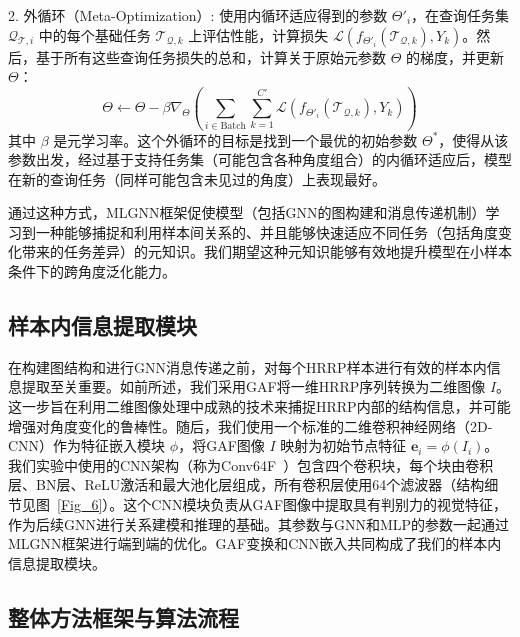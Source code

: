 2.  外循环（Meta-Optimization）: 使用内循环适应得到的参数 $\Theta'_i$，在查询任务集 $\mathcal{Q}_{\mathcal{T},i}$ 中的每个基础任务 $\mathcal{T}_{\mathcal{Q},k}$ 上评估性能，计算损失 $\mathcal{L}(f_{\Theta'_i}(\mathcal{T}_{\mathcal{Q},k}), Y_k)$。然后，基于所有这些查询任务损失的总和，计算关于原始元参数 $\Theta$ 的梯度，并更新 $\Theta$：
    \begin{equation}
        \Theta \leftarrow \Theta - \beta \nabla_{\Theta} \left( \sum_{i \in \text{Batch}} \sum_{k=1}^{C'} \mathcal{L}(f_{\Theta'_i}(\mathcal{T}_{\mathcal{Q},k}), Y_k) \right)
        \label{eq:mlgnn_outer_update}
    \end{equation}
    其中 $\beta$ 是元学习率。这个外循环的目标是找到一个最优的初始参数 $\Theta^*$，使得从该参数出发，经过基于支持任务集（可能包含各种角度组合）的内循环适应后，模型在新的查询任务（同样可能包含未见过的角度）上表现最好。

通过这种方式，MLGNN框架促使模型（包括GNN的图构建和消息传递机制）学习到一种能够捕捉和利用样本间关系的、并且能够快速适应不同任务（包括角度变化带来的任务差异）的元知识。我们期望这种元知识能够有效地提升模型在小样本条件下的跨角度泛化能力。

\subsection{样本内信息提取模块}
\label{subsec:intra_sample_module}

在构建图结构和进行GNN消息传递之前，对每个HRRP样本进行有效的样本内信息提取至关重要。如前所述，我们采用GAF将一维HRRP序列转换为二维图像 $I$。这一步旨在利用二维图像处理中成熟的技术来捕捉HRRP内部的结构信息，并可能增强对角度变化的鲁棒性。随后，我们使用一个标准的二维卷积神经网络（2D-CNN）作为特征嵌入模块 $\phi$，将GAF图像 $I$ 映射为初始节点特征 $\mathbf{e}_i = \phi(I_i)$。我们实验中使用的CNN架构（称为Conv64F~\cite{ref33}）包含四个卷积块，每个块由卷积层、BN层、ReLU激活和最大池化层组成，所有卷积层使用64个滤波器（结构细节见图~\ref{Fig_6}）。这个CNN模块负责从GAF图像中提取具有判别力的视觉特征，作为后续GNN进行关系建模和推理的基础。其参数与GNN和MLP的参数一起通过MLGNN框架进行端到端的优化。GAF变换和CNN嵌入共同构成了我们的样本内信息提取模块。

\subsection{整体方法框架与算法流程}
\label{subsec:overall_framework_angle}

